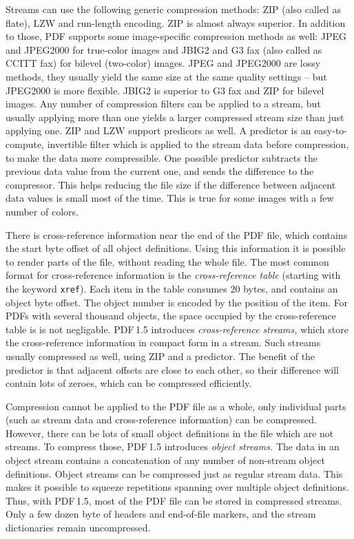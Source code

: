\documentclass{ltugproc}
\begin{document}
Streams can use the following generic compression methods: ZIP (also called
as flate), LZW and run-length encoding. ZIP is almost always superior. In
addition to those, PDF supports some image-specific compression methods as
well: JPEG and JPEG2000 for true-color images and JBIG2 and G3 fax (also
called as CCITT fax) for bilevel (two-color) images. JPEG and JPEG2000 are
lossy methods, they usually yield the same size at the same quality
settings -- but JPEG2000 is more flexible. JBIG2 is superior to G3 fax and
ZIP for bilevel images. Any number of compression filters can be applied to
a stream, but usually applying more than one yields a larger compressed
stream size than just applying one. ZIP and LZW support predicors as well. A
predictor is an easy-to-compute, invertible filter which is applied to the
stream data before compression, to make the data more compressible. One
possible predictor subtracts the previous data value from the current one,
and sends the difference to the compressor. This helps reducing the file
size if the difference between adjacent data values is small most of the
time. This is true for some images with a few number of colors.

There is cross-reference information near the end of the PDF file, which
contains the start byte offset of all object definitions. Using this
information it is possible to render parts of the file, without reading the
whole file. The most common format for cross-reference information is the
\emph{cross-reference table} (starting with the keyword \texttt{xref}). Each item
in the table consumes 20 bytes, and contains an object byte offset. The
object number is encoded by the position of the item. For PDFs with several
thousand objects, the space occupied by the cross-reference table is is not
negligable. PDF\,1.5 introduces \emph{cross-reference streams,} which store
the cross-reference information in compact form in a stream. Such streams
usually compressed as well, using ZIP and a predictor. The benefit of the
predictor is that adjacent offsets are close to each other, so their
difference will contain lots of zeroes, which can be compressed efficiently.

Compression cannot be applied to the PDF file as a whole, only individual
parts (such as stream data and cross-reference information) can be
compressed. However, there can be lots of small object definitions in the
file which are not streams. To compress those, PDF\,1.5 introduces
\emph{object streams.} The data in an object stream contains a concatenation
of any number of non-stream object definitions. Object streams can be
compressed just as regular stream data. This makes it possible to squeeze
repetitions spanning over multiple object definitions. Thus, with PDF\,1.5,
most of the PDF file can be stored in compressed streams. Only a few dozen
byte of headers and end-of-file markers, and the stream dictionaries remain
uncompressed.
\end{document}
